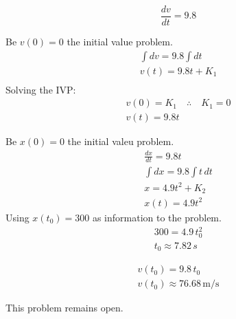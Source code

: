 \begin{solution}
	$$\frac{dv}{dt}=9.8$$
	\begin{solparts}
		\item
		Be $v(0)=0$ the initial value problem. 
		\begin{gather*}
			\int dv=9.8\int dt\\
			v(t)=9.8t+K_1\\
		\end{gather*}
		Solving the IVP:
		\begin{gather*}
			v(0)=K_1 \quad \therefore \quad K_1=0\\
			\boxed{v(t)=9.8t}
		\end{gather*}
	
		\item
		Be $x(0)=0$ the initial valeu problem.
		\begin{gather*}
			\frac{dx}{dt}=9.8t\\
			\int dx=9.8\int t \, dt\\
			x=4.9t^2+K_2\\
			x(t)=4.9t^2
		\end{gather*}
		Using $x(t_0)=300$ as information to the problem.
		\begin{gather*}
			300 = 4.9\, t_0^2\\
			\boxed{t_0\approx 7.82\, s}
		\end{gather*}
		\item
		\begin{gather*}
			v(t_0)=9.8\, t_0\\
			\boxed{v(t_0)\approx 76.68 \, \text{m/s}}
		\end{gather*}
	\end{solparts}
\end{solution}

\begin{solution}
	This problem remains open.
\end{solution}

